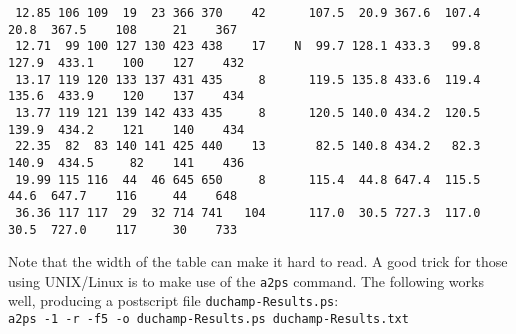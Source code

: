 \begin{landscape}
{\begin{verbatim}
 12.85 106 109  19  23 366 370    42      107.5  20.9 367.6  107.4   20.8  367.5    108     21    367
 12.71  99 100 127 130 423 438    17    N  99.7 128.1 433.3   99.8  127.9  433.1    100    127    432
 13.17 119 120 133 137 431 435     8      119.5 135.8 433.6  119.4  135.6  433.9    120    137    434
 13.77 119 121 139 142 433 435     8      120.5 140.0 434.2  120.5  139.9  434.2    121    140    434
 22.35  82  83 140 141 425 440    13       82.5 140.8 434.2   82.3  140.9  434.5     82    141    436
 19.99 115 116  44  46 645 650     8      115.4  44.8 647.4  115.5   44.6  647.7    116     44    648
 36.36 117 117  29  32 714 741   104      117.0  30.5 727.3  117.0   30.5  727.0    117     30    733

  \end{verbatim}
}

Note that the width of the table can make it hard to read. A good
trick for those using UNIX/Linux is to make use of the \texttt{a2ps}
command. The following works well, producing a postscript file
\texttt{duchamp-Results.ps}:
\\\verb|a2ps -1 -r -f5 -o duchamp-Results.ps duchamp-Results.txt|
\end{landscape}
